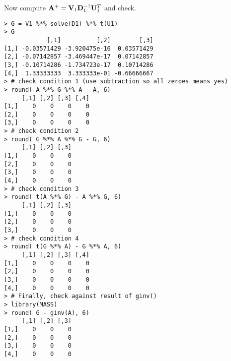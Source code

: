 \bigskip
\noindent
Now compute ${\bf A}^+={\bf V}_1{\bf D}_1^{-1}{\bf U}_1^T$ and check.
\begin{verbatim}
> G = V1 %*% solve(D1) %*% t(U1)
> G
            [,1]          [,2]        [,3]
[1,] -0.03571429 -3.920475e-16  0.03571429
[2,] -0.07142857 -3.469447e-17  0.07142857
[3,] -0.10714286 -1.734723e-17  0.10714286
[4,]  1.33333333  3.333333e-01 -0.66666667
> # check condition 1 (use subtraction so all zeroes means yes)
> round( A %*% G %*% A - A, 6)
     [,1] [,2] [,3] [,4]
[1,]    0    0    0    0
[2,]    0    0    0    0
[3,]    0    0    0    0
> # check condition 2
> round( G %*% A %*% G - G, 6)
     [,1] [,2] [,3]
[1,]    0    0    0
[2,]    0    0    0
[3,]    0    0    0
[4,]    0    0    0
> # check condition 3
> round( t(A %*% G) - A %*% G, 6)
     [,1] [,2] [,3]
[1,]    0    0    0
[2,]    0    0    0
[3,]    0    0    0
> # check condition 4
> round( t(G %*% A) - G %*% A, 6)
     [,1] [,2] [,3] [,4]
[1,]    0    0    0    0
[2,]    0    0    0    0
[3,]    0    0    0    0
[4,]    0    0    0    0
> # Finally, check against result of ginv()
> library(MASS)
> round( G - ginv(A), 6)
     [,1] [,2] [,3]
[1,]    0    0    0
[2,]    0    0    0
[3,]    0    0    0
[4,]    0    0    0
\end{verbatim}
